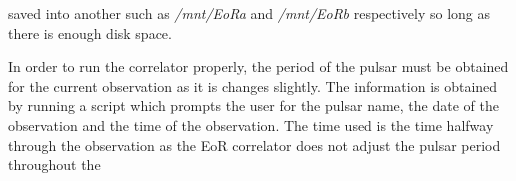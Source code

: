 \documentclass[a4paper,12pt]{article}
\begin{document}
saved into another such as \emph{/mnt/EoRa} and \emph{/mnt/EoRb} respectively so long as there is enough disk space.

                                                                                                                                                                                                                                                                                                                                                                                                                                                                                                                                                                                                                                                                                                                                                                                                                                                                                                                                                                                                                                                                                                                                                                                                                                                                                                                                                                                                                                                                                                                                                                                                                                                                                                                                                                                                                                                                                                                                                                                                                                                                                                                                                                                                                                                                                                                                                                                                                                                                                                                                                                                                                                                                                                                                                                                                                                              In order to run the correlator properly, the period of the pulsar must be obtained for the current observation as it is changes slightly. The information is obtained by running a script which prompts the user for the pulsar name, the date of the observation and the time of the observation. The time used is the time halfway through the observation as the EoR correlator does not adjust the pulsar period throughout the 
\end{document}
